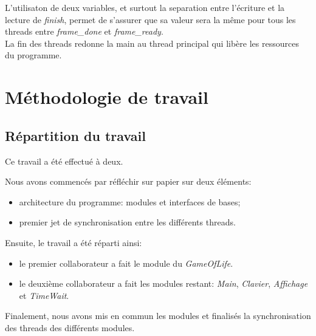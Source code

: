 \documentclass[11pt, a4paper]{article}
\begin{document}
L'utilisaton de deux variables, et surtout la separation entre l'écriture et la lecture de \textit{finish}, permet de s'assurer que sa valeur sera la même pour tous les threads entre \textit{frame\_done} et \textit{frame\_ready}. \\

La fin des threads redonne la main au thread principal qui libère les ressources du programme.

\newpage

\section{Méthodologie de travail}
\subsection{Répartition du travail}

Ce travail a été effectué à deux.

Nous avons commencés par réfléchir sur papier sur deux éléments:

\begin{itemize}
    \item architecture du programme: modules et interfaces de bases;
    \item premier jet de synchronisation entre les différents threads. \\
\end{itemize}

Ensuite, le travail a été réparti ainsi:
\begin{itemize}
    \item le premier collaborateur a fait le module du \textit{GameOfLife}.
    \item le deuxième collaborateur a fait les modules restant: \textit{Main}, \textit{Clavier}, \textit{Affichage} et \textit{TimeWait}. \\
\end{itemize}

Finalement, nous avons mis en commun les modules et finalisés la synchronisation des threads des différents modules.

\newpage
\end{document}
